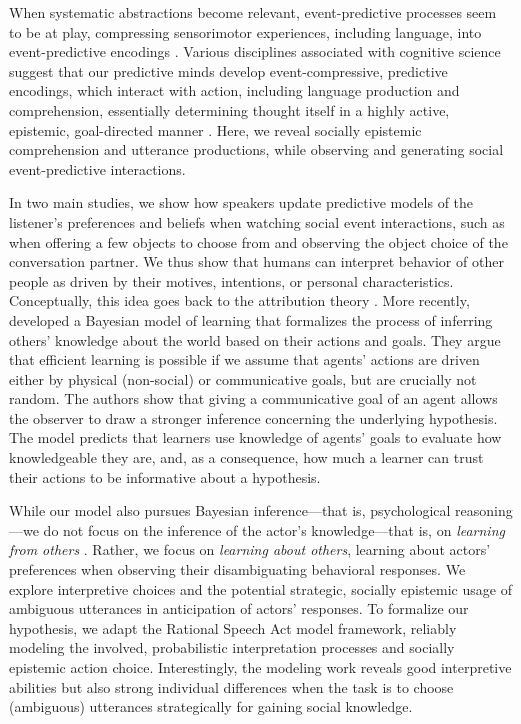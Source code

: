 \documentclass[10pt,a4paper]{article}
\begin{document}
When systematic abstractions become relevant, event-predictive processes seem to be at play, compressing sensorimotor experiences, including language, into event-predictive encodings \cite{Butz:2016,Butz:2017a}.
Various disciplines associated with cognitive science suggest that our predictive minds develop event-compressive, predictive encodings, which interact with action, including language production and comprehension, essentially determining thought itself in a highly active, epistemic, goal-directed manner  \cite{Baldwin:2019tsi,DuBrow:2019tsi,Elsner:2019tsi,Fallgatter:2019tsi,Knott:2019tsi,Papafragou:2019tsi,Zacks:2019tsi}.
Here, we reveal socially epistemic comprehension and utterance productions, while observing and generating social event-predictive interactions.


In two main studies, we show how speakers update predictive models of the listener's preferences and beliefs when watching social event interactions, such as when offering a few objects to choose from and observing the object choice of the conversation partner. 
We thus show that humans can interpret behavior of other people as driven by their motives, intentions, or personal characteristics.
Conceptually, this idea goes back to the attribution theory \cite{jones1965acts, kelley1967attribution, kelley1970social}.
More recently,  developed a Bayesian model of learning that formalizes the process of inferring others' knowledge about the world based on their actions and goals. They argue that efficient learning is possible if we assume that agents' actions are driven either by physical (non-social) or communicative goals, but are crucially not random. The authors show that giving a communicative goal of an agent allows the observer to draw a stronger inference concerning the underlying hypothesis.
The model predicts that learners use knowledge of agents' goals to evaluate how knowledgeable they are, and, as a consequence, how much a learner can trust their actions to be informative about a hypothesis.
 

While our model also pursues Bayesian inference---that is, psychological reasoning---we do not focus on the inference of the actor's knowledge---that is, on \emph{learning from others} \cite{shafto2012learning}.
Rather, we focus on \emph{learning about others}, learning about actors' preferences when observing their disambiguating behavioral responses. We explore interpretive choices
and the potential strategic, socially epistemic usage of ambiguous utterances in anticipation of actors' responses. 
To formalize our hypothesis, we adapt the Rational Speech Act model framework, reliably modeling the involved, probabilistic interpretation processes and socially epistemic action choice. 
Interestingly, the modeling work reveals good interpretive abilities but also strong individual differences when the task is to choose (ambiguous) utterances strategically for gaining social knowledge. 
\end{document}
